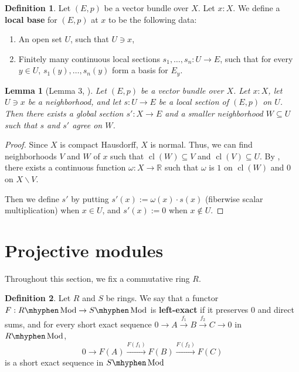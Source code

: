 \documentclass[11pt]{article}
\newcommand{\R}{\mathbb{R}}
\newcommand{\Mod}{\mhyphen\operatorname{Mod}}
\theoremstyle{plain}
\newtheorem{lemma}{Lemma}[section]
\theoremstyle{definition}
\newtheorem{definition}{Definition}[section]
\newcommand{\cl}{\operatorname{cl}}
\begin{document}
\begin{definition}\label{def:local-base}
  Let \((E,p)\) be a vector bundle over \(X\). Let \(x : X\). We define a \textbf{local base} for \((E,p)\) at \(x\) to be the following data:
  \begin{enumerate}[label={(\alph*)}]
  \item An open set \(U\), such that \(U \ni x\),
  \item Finitely many continuous local sections \(s_1, \dots, s_n : U \to E\), such that for every \(y \in U\), \(s_1(y), \dots, s_n(y)\) form a basis for \(E_y\).
  \end{enumerate}
\end{definition}

\begin{lemma}[Lemma 3, \cite{swan1962vector}]\label{lemma:section-extension}
  Let \((E,p)\) be a vector bundle over \(X\). Let \(x : X\), let \(U \ni x\) be a neighborhood, and let \(s : U \to E\) be a local section of \((E,p)\) on \(U\). Then there exists a global section \(s' : X \to E\) and a smaller neighborhood \(W \subseteq U\) such that \(s\) and \(s'\) agree on \(W\).
\end{lemma}

\begin{proof}
  Since \(X\) is compact Hausdorff, \(X\) is normal. Thus, we can find neighborhoods \(V\) and \(W\) of \(x\) such that \(\cl(W) \subseteq V\) and \(\cl(V) \subseteq U\). By , there exists a continuous function \(\omega : X \to \R\) such that \(\omega\) is \(1\) on \(\cl(W)\) and \(0\) on \(X \backslash V\).

  Then we define \(s'\) by putting \(s'(x) := \omega(x) \cdot s(x)\) (fiberwise scalar multiplication) when \(x \in U\), and \(s'(x) := 0\) when \(x \notin U\).
\end{proof}

\section{Projective modules}
Throughout this section, we fix a commutative ring \(R\).

\begin{definition} \label{def:left-exact}
  Let \(R\) and \(S\) be rings. We say that a functor \(F : R\Mod \to S\Mod\) is \textbf{left-exact} if it preserves \(0\) and direct sums, and for every short exact sequence \(0 \to A \overset{f_1}{\to} B \overset{f_2}{\to} C \to 0\) in \(R\Mod\),
  \[0 \to F(A) \overset{F(f_1)}{\to} F(B) \overset{F(f_2)}{\to} F(C)\]
  is a short exact sequence in \(S\Mod\)
\end{definition}
\end{document}
